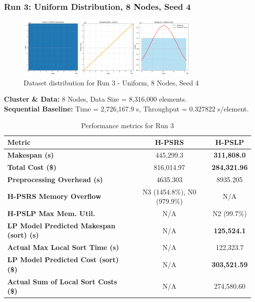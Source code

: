 \documentclass[]{interact}
\theoremstyle{plain}
\theoremstyle{definition}
\theoremstyle{remark}
\begin{document}
\subsubsection{Run 3: Uniform Distribution, 8 Nodes, Seed 4}

\begin{figure}[H]
    \centering
    \includegraphics[width=0.8\textwidth]{src/out/3run_8node_4seed_uniform.png}
    \caption{Dataset distribution for Run 3 - Uniform, 8 Nodes, Seed 4}
    \label{fig:run3_dist}
\end{figure}

\textbf{Cluster \& Data:} 8 Nodes, Data Size = 8,316,000 elements.\\
\textbf{Sequential Baseline:} Time = 2,726,167.9 \textmu{}s, Throughput = 0.327822 \textmu{}s/element.

\begin{table}[H]
\centering
\caption{Performance metrics for Run 3}
\label{tab:run3}
\begin{tabular}{@{}lcc@{}}
\toprule
\textbf{Metric} & \textbf{H-PSRS} & \textbf{H-PSLP} \\
\midrule
\textbf{Makespan (\textmu{}s)} & 445,299.3 & \textbf{311,808.0} \\
\textbf{Total Cost (\$)} & 816,014.97 & \textbf{284,321.96} \\
\textbf{Preprocessing Overhead (\textmu{}s)} & 4635.303 & 8935.205 \\
\textbf{H-PSRS Memory Overflow} & N3 (1454.8\%), N0 (979.9\%) & N/A \\
\textbf{H-PSLP Max Mem. Util.} & N/A & N2 (99.7\%) \\
\textbf{LP Model Predicted Makespan (sort) (\textmu{}s)} & N/A & \textbf{125,524.1} \\
\textbf{Actual Max Local Sort Time (\textmu{}s)} & N/A & 122,323.7 \\
\textbf{LP Model Predicted Cost (sort) (\$)} & N/A & \textbf{303,521.59} \\
\textbf{Actual Sum of Local Sort Costs (\$)} & N/A & 274,580.60 \\
\bottomrule
\end{tabular}
\end{table}
\end{document}
